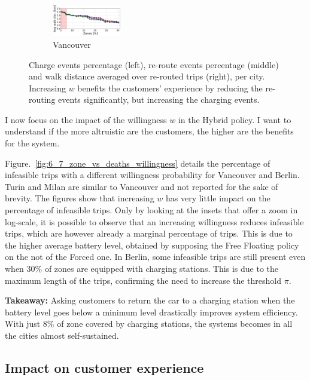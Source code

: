 \begin{figure}[t!]
\begin{center}
\begin{subfigure}{\textwidth}
            \includegraphics[width=0.33\textwidth]{figures/cut_Vancouver_AvgWalkedDistanceVsZones_Policy_44_tt-25_100_4.pdf}
             \caption{Vancouver}
             \label{fig:6_7_zone_vs_metric_vancouver}
         \end{subfigure}         
         \caption{Charge events percentage (left), re-route events percentage (middle) and walk distance averaged over re-routed trips (right),  per city. Increasing $w$ benefits the customers' experience by reducing the re-routing events significantly, but increasing the charging events.}
         \label{fig:6_7_zone_vs_metric}
\end{center}
\end{figure}

I now focus on the impact of the willingness $w$ in the Hybrid policy. I want to understand if the more altruistic are the customers, the higher are the benefits for the system.

Figure.~\ref{fig:6_7_zone_vs_deaths_willingness} details the percentage of infeasible trips with a different willingness probability for Vancouver and Berlin. Turin and Milan are similar to Vancouver and not reported for the sake of brevity. The figures show that increasing $w$ has very little impact on the percentage of infeasible trips. Only by looking at the insets that offer a zoom in log-scale, it is possible to observe that an increasing willingness reduces infeasible trips, which are however already a marginal percentage of trips. This is due to the higher average battery level, obtained by supposing the Free Floating policy on the not of the Forced one.
In Berlin, some infeasible trips are still present even when 30\% of zones are equipped with charging stations. This is due to the maximum length of the trips, confirming the need to increase the threshold $\pi$. 

\textbf{Takeaway:} Asking customers to return the car to a charging station when the battery level goes below a minimum level drastically improves system efficiency. With just 8\% of zone covered by charging stations, the systems becomes in all the cities almost self-sustained.

\subsection{Impact on customer experience}

